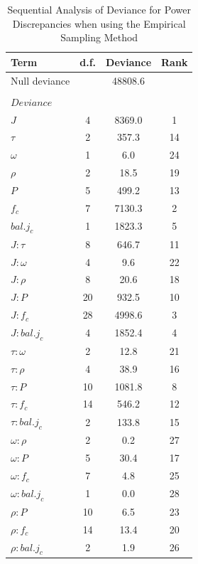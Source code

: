 \begin{table}[H]
\caption{Sequential Analysis of Deviance for Power Discrepancies when using the Empirical Sampling Method}\label{tab:SequentialAnalysis}
    \centering
    \begin{tabular*}{\textwidth}{@{\extracolsep{\fill}}
    l
    S[table-format=2.0]
    S[table-format=5.1]
    S[table-format=2.0]
    }
    \toprule
        Term & {d.f.} & {Deviance} & {Rank} \\ 
        \midrule
        Null deviance & & 48808.6 & \\
        &&&\\
       $Deviance$ & & & \\
       $J$ & 4 & 8369.0 & 1 \\
       $\tau$ & 2 & 357.3 & 14  \\ 
       $\omega$ & 1 & 6.0 & 24 \\
       $\rho$ & 2 & 18.5 & 19 \\
       $P$ & 5 & 499.2 & 13 \\
       $f_c$ & 7 & 7130.3 & 2 \\
       $bal. j_c$ & 1 & 1823.3 & 5 \\
       $J:\tau$ & 8 & 646.7 & 11  \\ 
       $J:\omega$ & 4 & 9.6 & 22 \\
       $J:\rho$ & 8 & 20.6 & 18 \\
       $J:P$ & 20 & 932.5 & 10 \\
       $J:f_c$ & 28 & 4998.6 & 3 \\
       $J:bal. j_c$ & 4 & 1852.4 & 4 \\
       $\tau:\omega$ & 2 & 12.8 & 21 \\
       $\tau:\rho$ & 4 & 38.9 & 16 \\
       $\tau:P$ & 10 & 1081.8 & 8 \\
       $\tau:f_c$ & 14 & 546.2 & 12 \\
       $\tau:bal. j_c$ & 2 & 133.8 & 15 \\
       $\omega:\rho$ & 2 & 0.2 & 27 \\
       $\omega:P$ & 5 & 30.4 & 17 \\
       $\omega:f_c$ & 7 & 4.8 & 25 \\
       $\omega:bal. j_c$ & 1 & 0.0 & 28 \\
       $\rho:P$ & 10 & 6.5 & 23 \\
       $\rho:f_c$ & 14 & 13.4 & 20 \\
       $\rho:bal. j_c$ & 2 & 1.9 & 26 \\ 

\end{tabular*}
\end{table}
